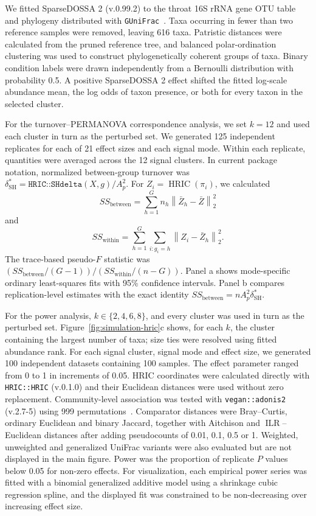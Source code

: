 
We fitted SparseDOSSA 2 (v.0.99.2) to the throat 16S rRNA gene OTU table and
phylogeny distributed with \texttt{GUniFrac}~\cite{charlson2010disordered,
chen2012associating,ma2021sparsedossa}. Taxa occurring in fewer than two
reference samples were removed, leaving 616 taxa. Patristic distances were
calculated from the pruned reference tree, and balanced polar-ordination
clustering was used to construct phylogenetically coherent groups of taxa.
Binary condition labels were drawn independently from a Bernoulli
distribution with probability 0.5. A positive SparseDOSSA 2 effect shifted
the fitted log-scale abundance mean, the log odds of taxon presence, or both
for every taxon in the selected cluster.

For the turnover--PERMANOVA correspondence analysis, we set \(k=12\) and used
each cluster in turn as the perturbed set. We generated 125 independent
replicates for each of 21 effect sizes and each signal mode. Within each
replicate, quantities were averaged across the 12 signal clusters. In current
package notation, normalized between-group turnover was
\(\delta_{\mathrm{SH}}^*
=\texttt{HRIC::SHdelta}(X,g)/A_p^2\). For
\(Z_i=\operatorname{HRIC}(\pi_i)\), we calculated
\[
SS_{\mathrm{between}}
  = \sum_{h=1}^{G}n_h
    \left\lVert\bar Z_h-\bar Z\right\rVert_2^2
\]
and
\[
SS_{\mathrm{within}}
  = \sum_{h=1}^{G}\sum_{i:g_i=h}
    \left\lVert Z_i-\bar Z_h\right\rVert_2^2 .
\]
The trace-based pseudo-\(F\) statistic was
\((SS_{\mathrm{between}}/(G-1))/(SS_{\mathrm{within}}/(n-G))\).
Panel a shows mode-specific ordinary least-squares fits with 95\% confidence
intervals. Panel b compares replication-level estimates with the exact
identity
\(SS_{\mathrm{between}}=nA_p^2\delta_{\mathrm{SH}}^*\).

For the power analysis, \(k\in\{2,4,6,8\}\), and every cluster was used in
turn as the perturbed set. Figure~\ref{fig:simulation-hric}c shows, for each
\(k\), the cluster containing the largest number of taxa; size ties were
resolved using fitted abundance rank. For each signal cluster, signal mode
and effect size, we generated 100 independent datasets containing 100
samples. The effect parameter ranged from 0 to 1 in increments of 0.05.
HRIC coordinates were calculated directly with \texttt{HRIC::HRIC} (v.0.1.0)
and their Euclidean distances were used without zero replacement.
Community-level association was tested with \texttt{vegan::adonis2}
(v.2.7-5) using 999 permutations~\cite{anderson2001new}. Comparator
distances were Bray--Curtis, ordinary Euclidean and binary Jaccard, together
with Aitchison and \(\operatorname{ILR}\)--Euclidean distances after adding
pseudocounts of 0.01, 0.1, 0.5 or 1. Weighted, unweighted and generalized
UniFrac variants were also evaluated but are not displayed in the main
figure. Power was the proportion of replicate \(P\) values below 0.05 for
non-zero effects. For visualization, each empirical power series was fitted
with a binomial generalized additive model using a shrinkage cubic regression
spline, and the displayed fit was constrained to be non-decreasing over
increasing effect size.

